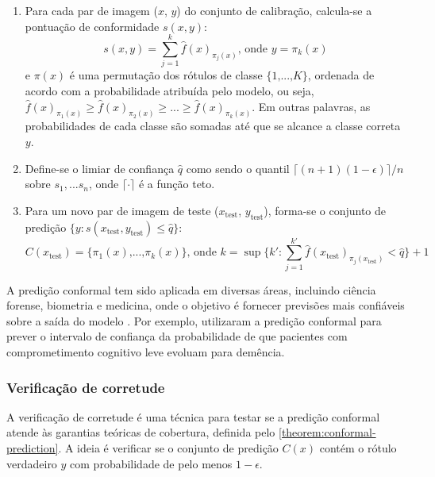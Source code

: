 \begin{enumerate}
    \item Para cada par de imagem ($x$, $y$) do conjunto de calibração, calcula-se a pontuação de conformidade $s(x,y)$:
    \begin{equation}
        s(x,y) = \sum_{j=1}^{k} \hat{f}(x)_{\pi_j(x)}\text{, onde } y = \pi_k(x)
    \end{equation}
    e $\pi(x)$ é uma permutação dos rótulos de classe $\lbrace 1 \text{,...,} K \rbrace$, ordenada de acordo com a probabilidade atribuída pelo modelo, ou seja, $\hat{f}(x)_{\pi_1(x)} \geq \hat{f}(x)_{\pi_2(x)} \geq ... \geq \hat{f}(x)_{\pi_k(x)}$. Em outras palavras, as probabilidades de cada classe são somadas até que se alcance a classe correta $y$.

    \item Define-se o limiar de confiança $\hat{q}$ como sendo o quantil ${\lceil (n+1)(1-\epsilon) \rceil}/n$ sobre $s_1, ... s_n$, onde $\lceil \cdot \rceil$ é a função teto.
    \item Para um novo par de imagem de teste ($x_{\text{test}}$, $y_{\text{test}}$), forma-se o conjunto de predição $\lbrace y:s(x_{\text{test}},y_{\text{test}}) \leq \hat{q} \rbrace$:
    \begin{equation}
        C(x_{\text{test}}) = \lbrace \pi_1(x) \text{,...,} \pi_k(x) \rbrace \text{, onde } k = \sup \Bigg\lbrace k' : \sum_{j=1}^{k'} \hat{f}(x_{\text{test}})_{\pi_j(x_{\text{test}})} < \hat{q} \Bigg\rbrace + 1
    \end{equation}
\end{enumerate}

A predição conformal tem sido aplicada em diversas áreas, incluindo ciência forense, biometria e medicina, onde o objetivo é fornecer previsões mais confiáveis sobre a saída do modelo \citep{Fontana2023}. Por exemplo, \cite{Pereira2020} utilizaram a predição conformal para prever o intervalo de confiança da probabilidade de que pacientes com comprometimento cognitivo leve evoluam para demência.


\subsubsection{Verificação de corretude}

A verificação de corretude é uma técnica para testar se a predição conformal atende às garantias teóricas de cobertura, definida pelo \autoref{theorem:conformal-prediction}. A ideia é verificar se o conjunto de predição $C(x)$ contém o rótulo verdadeiro $y$ com probabilidade de pelo menos $1 - \epsilon$.

